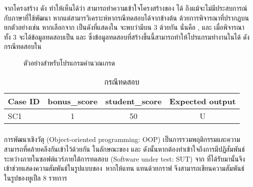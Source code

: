 {{จากโครงสร้าง{\sourcecode} ดัง{} ทำให้เห็นได้ว่า {\tester}สามารถทำความเข้าใจโครงสร้างของ{\sourcecode} ได้ 
ถึงแม้{\tester}จะไม่มีประสบการณ์กับภาษาที่ใช้พัฒนา หากแต่{\tester}สามารวิเคราะห์หากรณีทดสอบได้จาก{\cfg}ข้างต้น 
ด้วยการพิจารณา{\PredicateNode}ที่ปรากฏบน{\FirstTimeDefine{\TestPath}{\TestPathEN}} ยกตัวอย่างเช่น 
หากเลือก{\Path}จาก{} เป็น{\TestPath}ดังที่แสดงใน{} จะพบว่ามี{\PredicateNode}บน{\TestPath} 3 {\Node} 
ด้วยกัน นั่นคือ ,  และ  เมื่อพิจารณา{\PredicateNode}ทั้ง 3 {\Node}จะได้ข้อมูลทดสอบเป็น  และ 
 ซึ่งข้อมูลทดสอบที่สร้างขึ้นนี้สามารถทำให้โปรแกรมทำงานใน{\TestPath}ได้ 
ดังกรณีทดสอบใน

\begin{figure}[ht!]
    \centering
    \caption{ตัวอย่าง{\TestPath}สำหรับโปรแกรมคำนวณเกรด}
    \label{fig:testpath}
\end{figure}


\begin{table}[ht!]
    \centering
    \caption{กรณีทดสอบ}
    \label{tab:simpleTestCase}
    \begin{tabular}{|l|c|c|c|}
        \hline
        \rowcolor{LightGray}
        Case ID     & bonus\_score  & student\_score    & Expected output \\
        \hline
        SC1         & 1             & 50                & U \\
        \hline
    \end{tabular}
\end{table}

\subsubsection{\FirstTimeDefine{\scg}{\scgEN}}
\label{sec:sub:sub:scg}

การพัฒนา{\software}เชิงวัตุ (Object-oriented programming: OOP) เป็นการรวมพฤติกรรมและความสามารถที่คล้ายคลึงกันเข้าไว้ด้วยกัน \cite{kindler2011}
ในลักษณะของ\FirstTimeDefine{\class}{\classEN} \FirstTimeDefine{\method}{\methodEN} และ \FirstTimeDefine{\attribute}{\attributeEN} 
ดังนั้นหากต้องทำเข้าใจถึงการมีปฏิสัมพันธ์ระหว่าง{\class}ภายในซอฟต์แวร์ภายใต้การทดสอบ (Software under test: SUT) จาก{\sourcecode} 
ที่ได้รับมานั้น{\scg}จึงเข้าช่วยแสดงความสัมพันธ์ในรูปแบบของ\FirstTimeDefine{\DirectedMultiGraph}{\DirectedMultiGraphEN}\ หากให้แทน{\software}  
แทนด้วยกราฟ  จึงสามารถเขียนความสัมพันธ์ในรูปของทูเปิ้ล 8 รายการ 

}}
